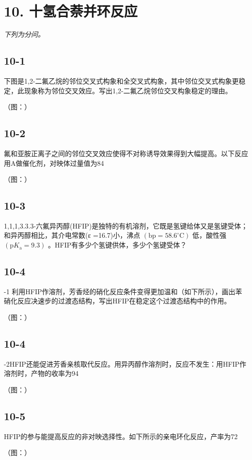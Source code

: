 \section*{10. 十氢合萘并环反应}
\textit{下列为分问。}

\subsection*{10-1}
下图是1,2-⼆氟⼄烷的邻位交叉式构象和全交叉式构象，其中邻位交叉式构象更稳定，此现象称为邻位交叉效应。写出1,2-⼆氟⼄烷邻位交叉构象稳定的理由。

（图：）

\subsection*{10-2}
氟和亚胺正离⼦之间的邻位交叉效应使得不对称诱导效果得到⼤幅提⾼。以下反应⽤A做催化剂，对映体过量值为84%

（图：）

\subsection*{10-3}
1,1,1,3.3.3-六氟异丙醇(HFIP)是独特的有机溶剂，它既是氢键给体⼜是氢键受体；和异丙醇相⽐，其介电常数(ε =16.7)⼩，沸点 $\mathrm { ( b p = 5 8 . 6 ^ { \circ } C ) }$ 低，酸性强 $\left( \mathrm { p } K _ { \mathrm { a } } = 9 . 3 \right)$ 。HFIP有多少个氢键供体，多少个氢键受体？

\subsection*{10-4}
-1 利⽤HFIP作溶剂，芳⾹烃的硝化反应条件变得更加温和（如下所⽰），画出苯硝化反应决速步的过渡态结构，写出HFIP在稳定这个过渡态结构中的作⽤。

（图：）

\subsection*{10-4}
-2HFIP还能促进芳⾹亲核取代反应。⽤异丙醇作溶剂时，反应不发⽣：⽤HFIP作溶剂时，产物的收率为94%

（图：）

\subsection*{10-5}
HFIP的参与能提⾼反应的⾮对映选择性。如下所⽰的亲电环化反应，产率为72%

（图：）
